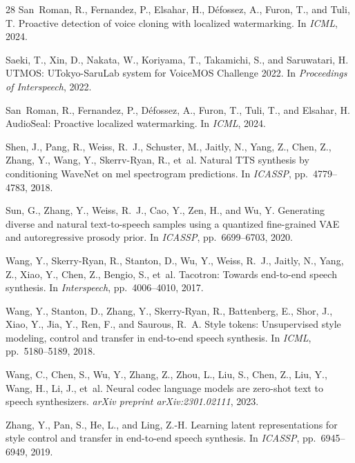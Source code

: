 \documentclass[11pt,a4paper]{article}
\begin{document}
\begin{thebibliography}{28}
San~Roman, R., Fernandez, P., Elsahar, H., D{\'e}fossez, A., Furon, T., and Tuli, T.
\newblock Proactive detection of voice cloning with localized watermarking.
\newblock In \emph{ICML}, 2024.

Saeki, T., Xin, D., Nakata, W., Koriyama, T., Takamichi, S., and Saruwatari, H.
\newblock UTMOS: UTokyo-SaruLab system for VoiceMOS Challenge 2022.
\newblock In \emph{Proceedings of Interspeech}, 2022.

San~Roman, R., Fernandez, P., D{\'e}fossez, A., Furon, T., Tuli, T., and Elsahar, H.
\newblock AudioSeal: Proactive localized watermarking.
\newblock In \emph{ICML}, 2024.

Shen, J., Pang, R., Weiss, R.~J., Schuster, M., Jaitly, N., Yang, Z., Chen, Z., Zhang, Y., Wang, Y., Skerrv-Ryan, R., et~al.
\newblock Natural TTS synthesis by conditioning WaveNet on mel spectrogram predictions.
\newblock In \emph{ICASSP}, pp.\ 4779--4783, 2018.

Sun, G., Zhang, Y., Weiss, R.~J., Cao, Y., Zen, H., and Wu, Y.
\newblock Generating diverse and natural text-to-speech samples using a quantized fine-grained VAE and autoregressive prosody prior.
\newblock In \emph{ICASSP}, pp.\ 6699--6703, 2020.

Wang, Y., Skerry-Ryan, R., Stanton, D., Wu, Y., Weiss, R.~J., Jaitly, N., Yang, Z., Xiao, Y., Chen, Z., Bengio, S., et~al.
\newblock Tacotron: Towards end-to-end speech synthesis.
\newblock In \emph{Interspeech}, pp.\ 4006--4010, 2017.

Wang, Y., Stanton, D., Zhang, Y., Skerry-Ryan, R., Battenberg, E., Shor, J., Xiao, Y., Jia, Y., Ren, F., and Saurous, R.~A.
\newblock Style tokens: Unsupervised style modeling, control and transfer in end-to-end speech synthesis.
\newblock In \emph{ICML}, pp.\ 5180--5189, 2018.

Wang, C., Chen, S., Wu, Y., Zhang, Z., Zhou, L., Liu, S., Chen, Z., Liu, Y., Wang, H., Li, J., et~al.
\newblock Neural codec language models are zero-shot text to speech synthesizers.
\newblock \emph{arXiv preprint arXiv:2301.02111}, 2023.

Zhang, Y., Pan, S., He, L., and Ling, Z.-H.
\newblock Learning latent representations for style control and transfer in end-to-end speech synthesis.
\newblock In \emph{ICASSP}, pp.\ 6945--6949, 2019.

\end{thebibliography}
\end{document}
